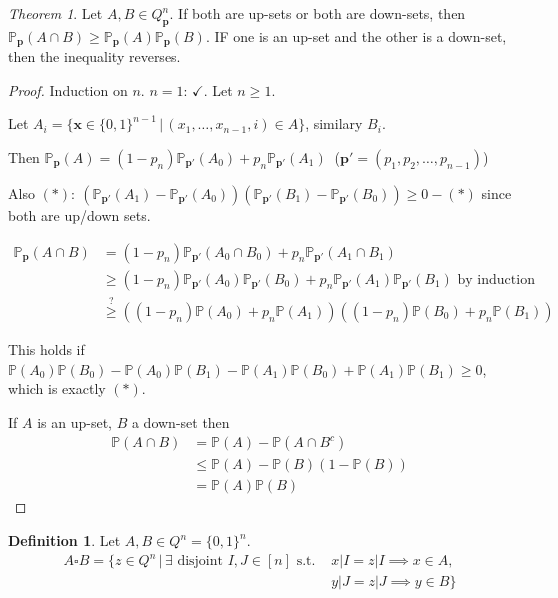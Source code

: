\documentclass[a4paper]{article}
\theoremstyle{definition}
\newtheorem*{definition}{Definition}
\theoremstyle{remark}
\theoremstyle{default}
\newtheorem{theorem}{Theorem}
\begin{document}
\begin{theorem}
	Let $A, B \in Q_\mathbf{p}^n$.
	If both are up-sets or both are down-sets,
	then $\mathbb{P}_\mathbf{p}(A \cap B) \geq \mathbb{P}_\mathbf{p}(A)\mathbb{P}_\mathbf{p}(B)$.
	IF one is an up-set and the other is a down-set, then the inequality reverses.
\end{theorem}
\begin{proof}
	Induction on $n$. $n=1$: $\checkmark$. Let $n \geq 1$.
	
	Let $A_i = \{\mathbf{x} \in \{0, 1\}^{n-1} \,|\, (x_1, \dots, x_{n-1} ,i) \in A\}$,
	similary $B_i$.
	
	Then $\mathbb{P}_\mathbf{p}(A) = (1-p_n)\mathbb{P}_\mathbf{p'}(A_0) + p_n\mathbb{P}_\mathbf{p'}(A_1)\ $
	($\mathbf{p'} = (p_1, p_2, \dots, p_{n-1})$)
	
	Also $(*):\ (\mathbb{P}_\mathbf{p'}(A_1)-\mathbb{P}_\mathbf{p'}(A_0))(\mathbb{P}_\mathbf{p'}(B_1)-\mathbb{P}_\mathbf{p'}(B_0)) \geq 0 - (*)$
	since both are up/down sets.
	
	\begin{align*}
		\mathbb{P}_\mathbf{p}(A \cap B) &= (1-p_n)\mathbb{P}_\mathbf{p'}(A_0 \cap B_0) + p_n\mathbb{P}_\mathbf{p'}(A_1 \cap B_1) \\
		&\geq (1-p_n)\mathbb{P}_\mathbf{p'}(A_0)\mathbb{P}_\mathbf{p'}(B_0) + p_n\mathbb{P}_\mathbf{p'}(A_1)\mathbb{P}_\mathbf{p'}(B_1) \text{ by induction} \\
		&\overset{?}{\geq} ((1-p_n)\mathbb{P}(A_0) + p_n\mathbb{P}(A_1))((1-p_n)\mathbb{P}(B_0)+p_n\mathbb{P}(B_1))
	\end{align*}
	
	This holds if $\mathbb{P}(A_0)\mathbb{P}(B_0)-\mathbb{P}(A_0)\mathbb{P}(B_1)-\mathbb{P}(A_1)\mathbb{P}(B_0)+\mathbb{P}(A_1)\mathbb{P}(B_1) \geq 0$,
	which is exactly $(*)$.
	
	If $A$ is an up-set, $B$ a down-set then
	\begin{align*}
		\mathbb{P}(A \cap B) &= \mathbb{P}(A) - \mathbb{P}(A\cap B^c) \\
		&\leq \mathbb{P}(A)-\mathbb{P}(B)(1-\mathbb{P}(B)) \\
		&= \mathbb{P}(A) \mathbb{P}(B)
	\end{align*}
\end{proof}

\begin{definition}
	Let $A, B \in Q^n = \{0, 1\}^n$.
	\begin{align*}
		A \square B = \{z \in Q^n \,|\, \exists \text{ disjoint } I, J \in [n] \text{ s.t. } &x|I = z|I \implies x\in A,\\ \, &y|J = z|J \implies y \in B \}
	\end{align*}
\end{definition}
\end{document}
